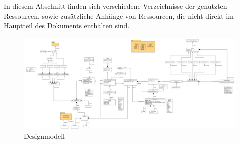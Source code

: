 \documentclass{article}
\newcommand{\listofcode}{
  \doublespacing
  \listof{Code}{Quelltextverzeichnis}
}
\begin{document}
In diesem Abschnitt finden sich verschiedene Verzeichnisse der genutzten 
Ressourcen, sowie zusätzliche Anhänge von Ressourcen, die nicht direkt im 
Hauptteil des Dokuments enthalten sind.

\listoffigures

\newpage

\begin{figure} [ht]
  \centering
  \includegraphics[angle=90,width=.65\linewidth]{design_full.png}
  \caption{Designmodell}
  \label{pic:design}
\end{figure}

\end{document}
